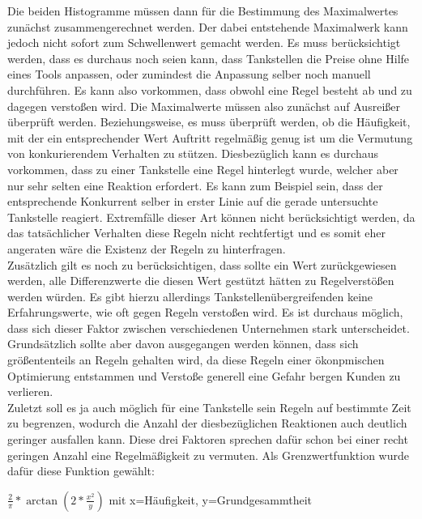 \documentclass[12pt,a4paper,bibliography=totocnumbered,listof=totocnumbered]{scrartcl}
\begin{document}
Die beiden Histogramme müssen dann für die Bestimmung des Maximalwertes zunächst zusammengerechnet werden. Der dabei entstehende Maximalwerk kann jedoch nicht sofort zum Schwellenwert gemacht werden. Es muss berücksichtigt werden, dass es durchaus noch seien kann, dass Tankstellen die Preise ohne Hilfe eines Tools anpassen, oder zumindest die Anpassung selber noch manuell durchführen. Es kann also vorkommen, dass obwohl eine Regel besteht ab und zu dagegen verstoßen wird. Die Maximalwerte müssen also zunächst auf Ausreißer überprüft werden. Beziehungsweise, es muss überprüft werden, ob die Häufigkeit, mit der ein entsprechender Wert Auftritt regelmäßig genug ist um die Vermutung von konkurierendem Verhalten zu stützen. Diesbezüglich kann es durchaus vorkommen, dass zu einer Tankstelle eine Regel hinterlegt wurde, welcher aber nur sehr selten eine Reaktion erfordert. Es kann zum Beispiel sein, dass der entsprechende Konkurrent selber in erster Linie auf die gerade untersuchte Tankstelle reagiert. Extremfälle dieser Art können nicht berücksichtigt werden, da das tatsächlicher Verhalten diese Regeln nicht rechtfertigt und es somit eher angeraten wäre die Existenz der Regeln zu hinterfragen.\\
Zusätzlich gilt es noch zu berücksichtigen, dass sollte ein Wert zurückgewiesen werden, alle Differenzwerte die diesen Wert gestützt hätten zu Regelverstößen werden würden. Es gibt hierzu allerdings Tankstellenübergreifenden keine Erfahrungswerte, wie oft gegen Regeln verstoßen wird. Es ist durchaus möglich, dass sich dieser Faktor zwischen verschiedenen Unternehmen stark unterscheidet. Grundsätzlich sollte aber davon ausgegangen werden können, dass sich größententeils an Regeln gehalten wird, da diese Regeln einer ökonpmischen Optimierung entstammen und Verstoße generell eine Gefahr bergen Kunden zu verlieren.\\
Zuletzt soll es ja auch möglich für eine Tankstelle sein Regeln auf bestimmte Zeit zu begrenzen, wodurch die Anzahl der diesbezüglichen Reaktionen auch deutlich geringer ausfallen kann. Diese drei Faktoren sprechen dafür schon bei einer recht geringen Anzahl eine Regelmäßigkeit zu vermuten. Als Grenzwertfunktion wurde dafür diese Funktion gewählt:
\begin{center}
$ \frac{2}{\pi}*\arctan(2*\frac{x^2}{y})$ mit x=Häufigkeit, y=Grundgesammtheit\\
\end{center}
\end{document}
